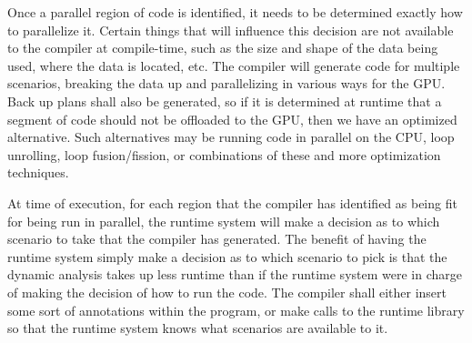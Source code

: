 \documentclass[a4paper,12pt]{article}
\begin{document}
Once a parallel region of code is identified, it needs to be determined exactly how to parallelize it.  Certain things that will influence this decision are not available to the compiler at compile-time, such as the size and shape of the data being used, where the data is located, etc.  The compiler will generate code for multiple scenarios, breaking the data up and parallelizing in various ways for the GPU.  Back up plans shall also be generated, so if it is determined at runtime that a segment of code should not be offloaded to the GPU, then we have an optimized alternative.  Such alternatives may be running code in parallel on the CPU, loop unrolling, loop fusion/fission, or combinations of these and more optimization techniques.  

At time of execution, for each region that the compiler has identified as being fit for being run in parallel, the runtime system will make a decision as to which scenario to take that the compiler has generated.  The benefit of having the runtime system simply make a decision as to which scenario to pick is that the dynamic analysis takes up less runtime than if the runtime system were in charge of making the decision of how to run the code.  The compiler shall either insert some sort of annotations within the program, or make calls to the runtime library so that the runtime system knows what scenarios are available to it.
\end{document}
